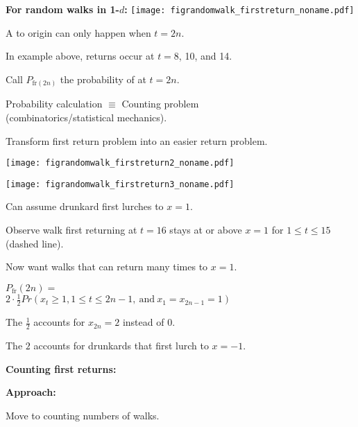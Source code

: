
  \textbf{For random walks in 1-$d$:}
    \texttt{[image: figrandomwalk\_firstreturn\_noname.pdf]}
    
    
      A  to origin can only happen when $t = 2n$.
    
      In example above, returns occur at $t=8$, 10, and 14.
    
      Call $P_{\textrm{fr}(2n)}$ the probability of  at $t=2n$.
     
      Probability calculation $\equiv$ Counting problem \\
      (combinatorics/statistical mechanics).
    
       Transform first return problem into an easier return problem.
    
  



  \small

  
          
      \texttt{[image: figrandomwalk\_firstreturn2\_noname.pdf]}%
      
      \texttt{[image: figrandomwalk\_firstreturn3\_noname.pdf]}
    
    
      Can assume drunkard first lurches to $x=1$.
     
      Observe walk first returning at $t=16$ stays at or above $x=1$ for $1 \le t \le 15$
      (dashed  line).
     
      Now want walks that can return many times to $x=1$.
     
      $P_{\textrm{fr}}(2n) = $ \\
      $2\cdot\frac{1}{2}Pr(x_{t} \ge 1, 1 \le t \le 2n-1, \ \mbox{and} \  x_1 = x_{2n-1} = 1) $
     
      The $\frac{1}{2}$ accounts for $x_{2n}=2$ instead of 0.
     
      The $2$ accounts for drunkards that first lurch to $x=-1$.
    
  


  \textbf{Counting first returns:}

  \textbf{Approach:}
    
    
      Move to counting numbers of walks.
    
